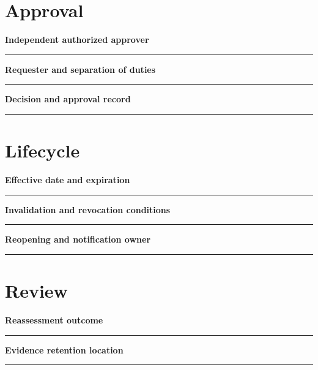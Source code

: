 \documentclass[11pt,letterpaper]{article}
\begin{document}
\section{Approval}
\noindent\textbf{Independent authorized approver}\par
\vspace{1.1em}\noindent\rule{0.96\linewidth}{0.4pt}\par\vspace{0.65em}
\noindent\textbf{Requester and separation of duties}\par
\vspace{1.1em}\noindent\rule{0.96\linewidth}{0.4pt}\par\vspace{0.65em}
\noindent\textbf{Decision and approval record}\par
\vspace{1.1em}\noindent\rule{0.96\linewidth}{0.4pt}\par\vspace{0.65em}
\section{Lifecycle}
\noindent\textbf{Effective date and expiration}\par
\vspace{1.1em}\noindent\rule{0.96\linewidth}{0.4pt}\par\vspace{0.65em}
\noindent\textbf{Invalidation and revocation conditions}\par
\vspace{1.1em}\noindent\rule{0.96\linewidth}{0.4pt}\par\vspace{0.65em}
\noindent\textbf{Reopening and notification owner}\par
\vspace{1.1em}\noindent\rule{0.96\linewidth}{0.4pt}\par\vspace{0.65em}
\section{Review}
\noindent\textbf{Reassessment outcome}\par
\vspace{1.1em}\noindent\rule{0.96\linewidth}{0.4pt}\par\vspace{0.65em}
\noindent\textbf{Evidence retention location}\par
\vspace{1.1em}\noindent\rule{0.96\linewidth}{0.4pt}\par\vspace{0.65em}
\end{document}

